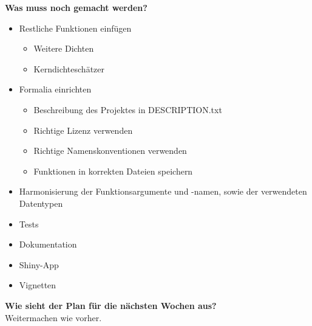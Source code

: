 \documentclass{scrartcl}
\begin{document}
\noindent\textbf{Was muss noch gemacht werden?}
\begin{itemize}
	\item Restliche Funktionen einfügen
	\begin{itemize}
		\item Weitere Dichten
		\item Kerndichteschätzer
	\end{itemize}
	
	\item Formalia einrichten
	\begin{itemize}
		\item Beschreibung des Projektes in DESCRIPTION.txt
		\item Richtige Lizenz verwenden
		\item Richtige Namenskonventionen verwenden
		\item Funktionen in korrekten Dateien speichern
	\end{itemize}

	\item Harmonisierung der Funktionsargumente und -namen, sowie der verwendeten Datentypen
	\item Tests
	\item Dokumentation
	\item Shiny-App
	\item Vignetten
\end{itemize}


\noindent\textbf{Wie sieht der Plan für die nächsten Wochen aus?} \\
Weitermachen wie vorher.
\end{document}
